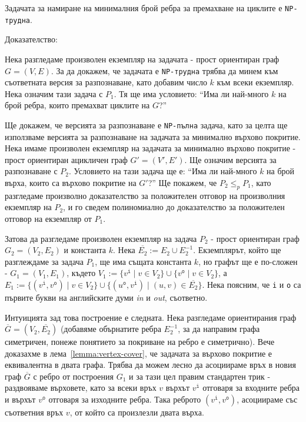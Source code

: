 \documentclass[12pt,twoside,a4paper]{article}
\begin{document}
	\begin{theorem} Задачата за намиране на минималния брой ребра за премахване на циклите е \texttt{NP-трудна}.
		
		\noindent Доказателство:
		
		Нека разгледаме произволен екземпляр на задачата - прост ориентиран граф $G=(V,E)$. За да докажем, че задачата е \texttt{NP-трудна} трябва да минем към съответната версия за разпознаване, като добавим число $k$ към всеки екземпляр. Нека означим тази задача с $P_1$. Тя ще има условието: "`Има ли най-много $k$ на брой ребра, които премахват циклите на $G$?"'
		
		Ще докажем, че версията за разпознаване е \texttt{NP-пълна} задача, като за целта ще използваме версията за разпознаване на задачата за минимално върхово покритие. Нека имаме произволен екземпляр на задачата за минимално върхово покритие - прост ориентиран ацикличен граф $G'=(V',E')$. Ще означим версията за разпознаване с $P_2$. Условието на тази задача ще е: "`Има ли най-много $k$ на брой върха, които са върхово покритие на $G'$?"' Ще покажем, че $P_2 \le_p P_1$, като разгледаме произволно доказателство за положителен отговор на произволния екземпляр на $P_2$, и го сведем полиномиално до доказателство за положителен отговор на екземпляр от $P_1$.
		
		Затова да разгледаме произволен екземпляр на задача $P_2$ - прост ориентиран граф $G_2=(V_2,E_2)$ и константа $k$. Нека $\overline{E_2} := E_2 \cup E_2^{-1}$. Екземплярът, който ще разглеждаме за задача $P_1$, ще има същата константа $k$, но графът ще е по-сложен - $G_1=(V_1,E_1)$, където $V_1 := \{v^\texttt{i} \mid v \in V_2\} \cup \{v^\texttt{o} \mid v \in V_2\}$, а $E_1 := \{(v^\texttt{i}, v^\texttt{o}) \mid v \in V_2\} \cup \{(u^\texttt{o},v^\texttt{i}) \mid (u,v) \in \overline{E_2}\}$. Нека поясним, че \texttt{i} и \texttt{o} са първите букви на английските думи \textit{in} и \textit{out}, съответно.
		
		Интуицията зад това построение е следната. Нека разгледаме ориентирания граф $\overline{G}=(V_2, \overline{E_2})$ (добавяме обърнатите ребра $E_2^{-1}$, за да направим графа симетричен, понеже понятието за покриване на ребро е симетрично). Вече доказахме в лема~\ref{lemma:vertex-cover}, че задачата за върхово покритие е еквивалентна в двата графа. Трябва да можем лесно да асоциираме връх в новия граф $\overline{G}$ с ребро от построения $G_1$ и за тази цел правим стандартен трик - раздвояваме върховете, като за всеки връх $v$ върхът $v^\texttt{i}$ отговаря за входните ребра и върхът $v^\texttt{o}$ отговаря за изходните ребра. Така реброто $(v^\texttt{i}, v^\texttt{o})$, асоциираме със съответния връх $v$, от който са произлезли двата върха.
		

\end{theorem}
\end{document}

